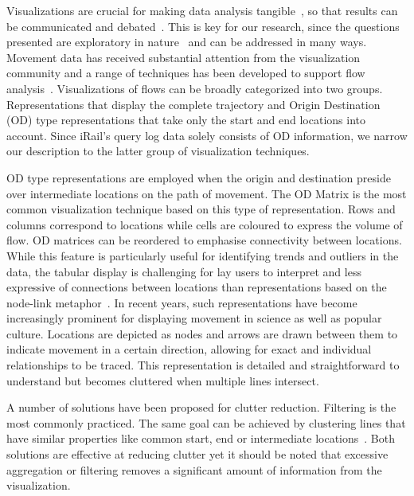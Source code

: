 \documentclass{sig-alternate}
\begin{document}
Visualizations are crucial for making data analysis tangible~\cite{thomas2006visual}, so that results can be communicated and debated~\cite{robinson2008collaborative}. 
This is key for our research, since the questions presented are exploratory in nature~\cite{kraak2008exploratory} and can be addressed in many ways. 
Movement data has received substantial attention from the visualization community and a range of techniques has been developed to support flow analysis~\cite{andrienko2012visual}. 
Visualizations of flows can be broadly categorized into two groups. 
Representations that display the complete trajectory and Origin Destination (OD) type representations that take only the start and end locations into account.
Since iRail's query log data solely consists of OD information, we narrow our description to the latter group of visualization techniques.

OD type representations are employed when the origin and destination preside over intermediate locations on the path of movement. The OD Matrix is the most common visualization technique based on this type of representation. 
Rows and columns correspond to locations while cells are coloured to express the volume of flow.
OD matrices can be reordered to emphasise connectivity between locations.
While this feature is particularly useful for identifying trends and outliers in the data, the tabular display is challenging for lay users to interpret and less expressive of connections between locations than representations based on the node-link metaphor~\cite{holten2011extended}.
In recent years, such representations have become increasingly prominent for displaying movement in science as well as popular culture.
Locations are depicted as nodes and arrows are drawn between them to indicate movement in a certain direction, allowing for exact and individual relationships to be traced. 
This representation is detailed and straightforward to understand but becomes cluttered when multiple lines intersect. 

A number of solutions have been proposed for clutter reduction. 
Filtering is the most commonly practiced. 
The same goal can be achieved by clustering lines that have similar properties like common start, end or intermediate locations~\cite{andrienko2007visual}. 
Both solutions are effective at reducing clutter yet it should be noted that excessive aggregation or filtering removes a significant amount of information from the visualization.
\end{document}
